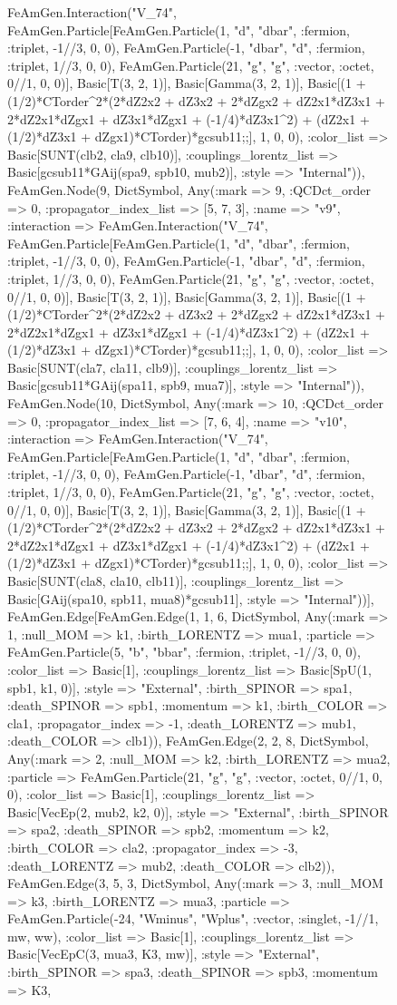 \documentclass{revtex4}
\begin{document}
\begin{figure}[!htb]
\begin{center}
{FeAmGen.Interaction("V_74", FeAmGen.Particle[FeAmGen.Particle(1, "d", "dbar", :fermion, :triplet, -1//3, 0, 0), FeAmGen.Particle(-1, "dbar", "d", :fermion, :triplet, 1//3, 0, 0), FeAmGen.Particle(21, "g", "g", :vector, :octet, 0//1, 0, 0)], Basic[T(3, 2, 1)], Basic[Gamma(3, 2, 1)], Basic[(1 + (1/2)*CTorder^2*(2*dZ2x2 + dZ3x2 + 2*dZgx2 + dZ2x1*dZ3x1 + 2*dZ2x1*dZgx1 + dZ3x1*dZgx1 + (-1/4)*dZ3x1^2) + (dZ2x1 + (1/2)*dZ3x1 + dZgx1)*CTorder)*gcsub11;;], 1, 0, 0), :color_list => Basic[SUNT(clb2, cla9, clb10)], :couplings_lorentz_list => Basic[gcsub11*GAij(spa9, spb10, mub2)], :style => "Internal")), FeAmGen.Node(9, Dict{Symbol, Any}(:mark => 9, :QCDct_order => 0, :propagator_index_list => [5, 7, 3], :name => "v9", :interaction => FeAmGen.Interaction("V_74", FeAmGen.Particle[FeAmGen.Particle(1, "d", "dbar", :fermion, :triplet, -1//3, 0, 0), FeAmGen.Particle(-1, "dbar", "d", :fermion, :triplet, 1//3, 0, 0), FeAmGen.Particle(21, "g", "g", :vector, :octet, 0//1, 0, 0)], Basic[T(3, 2, 1)], Basic[Gamma(3, 2, 1)], Basic[(1 + (1/2)*CTorder^2*(2*dZ2x2 + dZ3x2 + 2*dZgx2 + dZ2x1*dZ3x1 + 2*dZ2x1*dZgx1 + dZ3x1*dZgx1 + (-1/4)*dZ3x1^2) + (dZ2x1 + (1/2)*dZ3x1 + dZgx1)*CTorder)*gcsub11;;], 1, 0, 0), :color_list => Basic[SUNT(cla7, cla11, clb9)], :couplings_lorentz_list => Basic[gcsub11*GAij(spa11, spb9, mua7)], :style => "Internal")), FeAmGen.Node(10, Dict{Symbol, Any}(:mark => 10, :QCDct_order => 0, :propagator_index_list => [7, 6, 4], :name => "v10", :interaction => FeAmGen.Interaction("V_74", FeAmGen.Particle[FeAmGen.Particle(1, "d", "dbar", :fermion, :triplet, -1//3, 0, 0), FeAmGen.Particle(-1, "dbar", "d", :fermion, :triplet, 1//3, 0, 0), FeAmGen.Particle(21, "g", "g", :vector, :octet, 0//1, 0, 0)], Basic[T(3, 2, 1)], Basic[Gamma(3, 2, 1)], Basic[(1 + (1/2)*CTorder^2*(2*dZ2x2 + dZ3x2 + 2*dZgx2 + dZ2x1*dZ3x1 + 2*dZ2x1*dZgx1 + dZ3x1*dZgx1 + (-1/4)*dZ3x1^2) + (dZ2x1 + (1/2)*dZ3x1 + dZgx1)*CTorder)*gcsub11;;], 1, 0, 0), :color_list => Basic[SUNT(cla8, cla10, clb11)], :couplings_lorentz_list => Basic[GAij(spa10, spb11, mua8)*gcsub11], :style => "Internal"))], FeAmGen.Edge[FeAmGen.Edge(1, 1, 6, Dict{Symbol, Any}(:mark => 1, :null_MOM => k1, :birth_LORENTZ => mua1, :particle => FeAmGen.Particle(5, "b", "bbar", :fermion, :triplet, -1//3, 0, 0), :color_list => Basic[1], :couplings_lorentz_list => Basic[SpU(1, spb1, k1, 0)], :style => "External", :birth_SPINOR => spa1, :death_SPINOR => spb1, :momentum => k1, :birth_COLOR => cla1, :propagator_index => -1, :death_LORENTZ => mub1, :death_COLOR => clb1)), FeAmGen.Edge(2, 2, 8, Dict{Symbol, Any}(:mark => 2, :null_MOM => k2, :birth_LORENTZ => mua2, :particle => FeAmGen.Particle(21, "g", "g", :vector, :octet, 0//1, 0, 0), :color_list => Basic[1], :couplings_lorentz_list => Basic[VecEp(2, mub2, k2, 0)], :style => "External", :birth_SPINOR => spa2, :death_SPINOR => spb2, :momentum => k2, :birth_COLOR => cla2, :propagator_index => -3, :death_LORENTZ => mub2, :death_COLOR => clb2)), FeAmGen.Edge(3, 5, 3, Dict{Symbol, Any}(:mark => 3, :null_MOM => k3, :birth_LORENTZ => mua3, :particle => FeAmGen.Particle(-24, "Wminus", "Wplus", :vector, :singlet, -1//1, mw, ww), :color_list => Basic[1], :couplings_lorentz_list => Basic[VecEpC(3, mua3, K3, mw)], :style => "External", :birth_SPINOR => spa3, :death_SPINOR => spb3, :momentum => K3, }
\end{center}
\end{figure}
\end{document}
